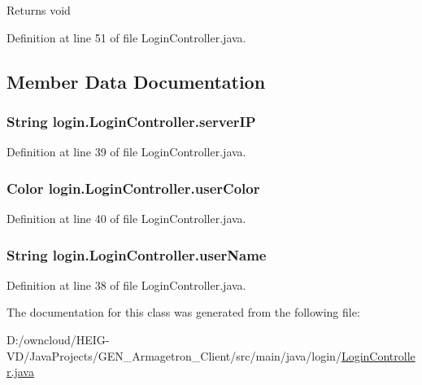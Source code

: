 \begin{DoxyReturn}{Returns}
void 
\end{DoxyReturn}


Definition at line 51 of file Login\+Controller.\+java.



\subsection{Member Data Documentation}
\subsubsection[{\texorpdfstring{server\+IP}{serverIP}}]{\setlength{\rightskip}{0pt plus 5cm}String login.\+Login\+Controller.\+server\+IP}\hypertarget{classlogin_1_1_login_controller_abe699936676f2262b822fe0dcafd35b1}{}\label{classlogin_1_1_login_controller_abe699936676f2262b822fe0dcafd35b1}


Definition at line 39 of file Login\+Controller.\+java.

\subsubsection[{\texorpdfstring{user\+Color}{userColor}}]{\setlength{\rightskip}{0pt plus 5cm}Color login.\+Login\+Controller.\+user\+Color}\hypertarget{classlogin_1_1_login_controller_a081ea0de3603e343739a9c123b52e622}{}\label{classlogin_1_1_login_controller_a081ea0de3603e343739a9c123b52e622}


Definition at line 40 of file Login\+Controller.\+java.

\subsubsection[{\texorpdfstring{user\+Name}{userName}}]{\setlength{\rightskip}{0pt plus 5cm}String login.\+Login\+Controller.\+user\+Name}\hypertarget{classlogin_1_1_login_controller_aca2945118c790e029183a46347154ee3}{}\label{classlogin_1_1_login_controller_aca2945118c790e029183a46347154ee3}


Definition at line 38 of file Login\+Controller.\+java.



The documentation for this class was generated from the following file\+:\begin{DoxyCompactItemize}
\item 
D\+:/owncloud/\+H\+E\+I\+G-\/\+V\+D/\+Java\+Projects/\+G\+E\+N\+\_\+\+Armagetron\+\_\+\+Client/src/main/java/login/\hyperlink{_login_controller_8java}{Login\+Controller.\+java}\end{DoxyCompactItemize}
